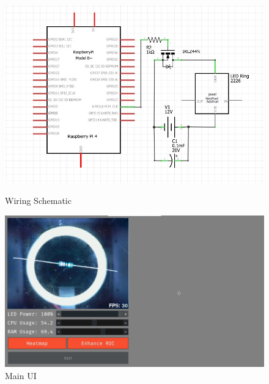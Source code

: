 \begin{figure}
  \begin{minipage}[t]{0.49\textwidth}
    \centering
    \includegraphics[width=\textwidth]{imgs/wiring.jpg}
    \caption{Wiring Schematic} \label{fig:wiringschematic}
  \end{minipage}
  \hfill
  \begin{minipage}[t]{0.49\textwidth}
      \centering
      \includegraphics[width=\textwidth]{imgs/software/realvnc.jpg}
      \caption{Main UI}
      \label{fig:mainui}
  \end{minipage}
\end{figure}



